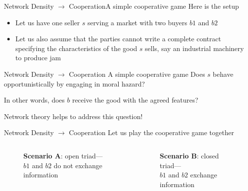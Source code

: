 \documentclass[notes, aspectratio=1610]{beamer}
\begin{document}
\begin{frame}{Network Density $\rightarrow$ Cooperation}{A simple cooperative game}
	Here is the setup 
	
	\begin{itemize}
		\item Let us have one seller $s$ serving a market with two 
		buyers $b1$ and $b2$
		\item Let us also assume that the parties cannot write a 
		complete contract specifying the characteristics of the good 
		$s$ sells, say an industrial machinery to produce jam 
	\end{itemize}
\end{frame}

\begin{frame}
	{Network Density $\rightarrow$ Cooperation}
	{A simple cooperative game}
	\centering
	\Large Does $s$ behave opportunistically by engaging in moral hazard? 
	
	In other words, does $b$ receive the good with the agreed features?

	\vspace{2em}

	\Large Network theory helps to address this question! 
\end{frame}

\begin{frame}
	{Network Density $\rightarrow$ Cooperation}
	{Let us play the cooperative game together}
	\begin{columns}
	\begin{column}{0.5\textwidth}
		\begin{figure}
				\begin{center}
					
				\end{center}
				\caption*{\textbf{Scenario A}: open triad---
				\\$b1$ and $b2$ do not exchange information}
		\end{figure}
	\end{column}
	\begin{column}{0.5\textwidth}
		\begin{figure}
			\begin{center}
				
			\end{center}
			\caption*{\textbf{Scenario B}: closed triad---
			\\$b1$ and $b2$ exchange information}
	\end{figure}
	\end{column}
	\end{columns}
\end{frame}
\end{document}
